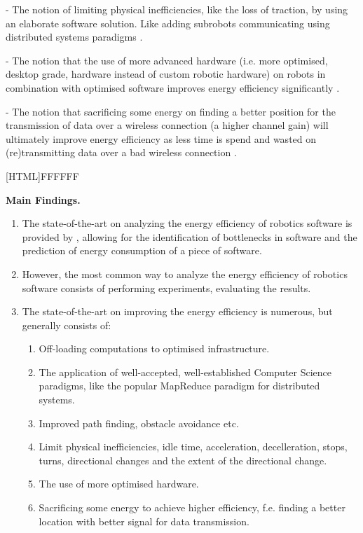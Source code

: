 - The notion of limiting physical inefficiencies, like the loss of traction, by using an elaborate software solution.
Like adding subrobots communicating using distributed systems paradigms \cite{kim2016firefighting_robot}.

- The notion that the use of more advanced hardware (i.e. more optimised, desktop grade, hardware instead of custom robotic hardware) 
on robots in combination with optimised software improves energy efficiency significantly \cite{cheng2018FPGA_image_recognition}.

- The notion that sacrificing some energy on finding a better position for the transmission of data over a wireless connection
(a higher channel gain) will ultimately improve energy efficiency as less time is spend and wasted on (re)transmitting 
data over a bad wireless connection \cite{licea2013wireless_comms}.

\vspace{5mm}

\noindent{}[HTML]{FFFFFF}{\parbox{0.47\textwidth}{%
\noindent \textbf{Main Findings.}
\begin{enumerate}[nolistsep]
\item The state-of-the-art on analyzing the energy efficiency of robotics software is provided by \cite{hou2017novel_cloud_evaluation_model}, allowing for the identification of bottlenecks in software and the prediction of energy consumption of a piece of software.
\item However, the most common way to analyze the energy efficiency of robotics software consists of performing experiments, evaluating the results.
\item The state-of-the-art on improving the energy efficiency is numerous, but generally consists of:
    \begin{enumerate}
        \item Off-loading computations to optimised infrastructure.
        \item The application of well-accepted, well-established Computer Science paradigms, like the popular MapReduce paradigm for distributed systems.
        \item Improved path finding, obstacle avoidance etc.
        \item Limit physical inefficiencies, idle time, acceleration, decelleration, stops, turns, directional changes and the extent of the directional change.
        \item The use of more optimised hardware.
        \item Sacrificing some energy to achieve higher efficiency, f.e. finding a better location with better signal for data transmission.
    \end{enumerate}
\end{enumerate}}}


